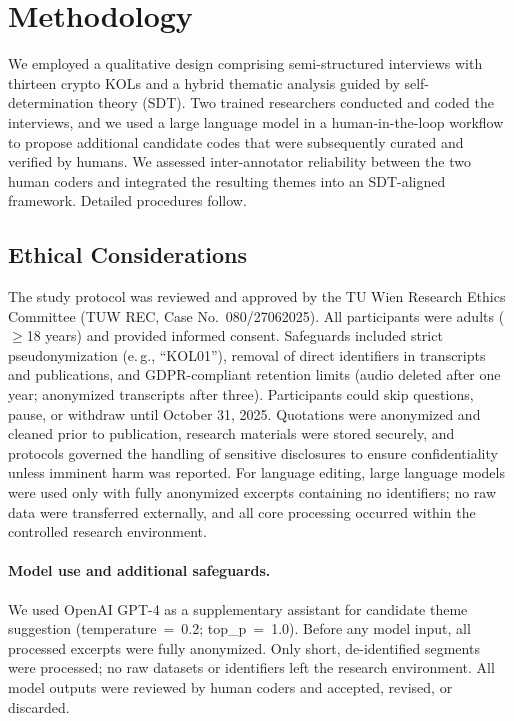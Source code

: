 
\section{Methodology}\label{sec:methodology}

We employed a qualitative design comprising semi-structured interviews with thirteen crypto KOLs and a hybrid thematic analysis guided by self-determination theory (SDT). Two trained researchers conducted and coded the interviews, and we used a large language model in a human-in-the-loop workflow to propose additional candidate codes that were subsequently curated and verified by humans. We assessed inter-annotator reliability between the two human coders and integrated the resulting themes into an SDT-aligned framework. Detailed procedures follow.
\subsection{Ethical Considerations}
\label{subsec:ethics}
The study protocol was reviewed and approved by the TU Wien Research Ethics Committee (TUW REC, Case No.\ 080/27062025). All participants were adults ($\geq$18 years) and provided informed consent. Safeguards included strict pseudonymization (e.\,g., ``KOL01''), removal of direct identifiers in transcripts and publications, and GDPR-compliant retention limits (audio deleted after one year; anonymized transcripts after three). Participants could skip questions, pause, or withdraw until October 31, 2025. Quotations were anonymized and cleaned prior to publication, research materials were stored securely, and protocols governed the handling of sensitive disclosures to ensure confidentiality unless imminent harm was reported. For language editing, large language models were used only with fully anonymized excerpts containing no identifiers; no raw data were transferred externally, and all core processing occurred within the controlled research environment.

\paragraph{Model use and additional safeguards.}
We used OpenAI GPT-4 as a supplementary assistant for candidate theme suggestion (temperature~=~0.2; top\_p~=~1.0). Before any model input, all processed excerpts were fully anonymized. Only short, de-identified segments were processed; no raw datasets or identifiers left the research environment. All model outputs were reviewed by human coders and accepted, revised, or discarded.

